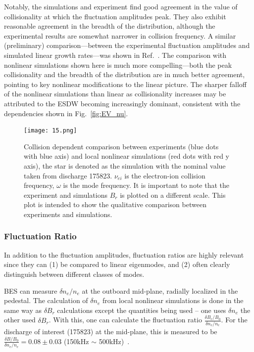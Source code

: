 \documentclass[
 aip,
 amsmath,amssymb,
 reprint
]{revtex4-1}
\begin{document}
Notably, the simulations and experiment find good agreement in the value of collisionality at which the fluctuation amplitudes peak.  They also exhibit reasonable agreement in the breadth of the distribution, although the experimental results are somewhat narrower in collision frequency.  A similar (preliminary) comparison---between the experimental fluctuation amplitudes and simulated linear growth rates---was shown in Ref.~\cite{RIP_Chen_POP_2020}.  The comparison with nonlinear simulations shown here is much more compelling---both the peak collisionality and the breadth of the distribution are in much better agreement, pointing to key nonlinear modifications to the linear picture. The sharper falloff of the nonlinear simulations than linear as collisionality increases may be attributed to the ESDW becoming increasingly dominant, consistent with the dependencies shown in Fig.~\ref{fig:EV_nu}. %

\begin{figure}[ht]
        \texttt{[image: 15.png]}
        \centering
        \caption[font=5]{Collision dependent comparison between experiments (blue dots with blue axis) and local nonlinear simulations (red dots with red y axis), the star is denoted as the simulation with the nominal value taken from discharge 175823. $\nu_{ei}$ is the electron-ion collision frequency, $\omega$ is the mode frequency. It is important to note that the experiment and simulations $B_r$ is plotted on a different scale.  This plot is intended to show the qualitative comparison between experiments and simulations. }
        \label{fig:nu_ei}
\end{figure}



\subsubsection{Fluctuation Ratio}

In addition to the fluctuation amplitudes, fluctuation ratios are highly relevant since they can (1) be compared to linear eigenmodes, and (2) often clearly distinguish between different classes of modes.

BES \cite{bes} can measure $\delta n_e/n_e$ at the outboard mid-plane, radially localized in the pedestal. The calculation of $\delta n_e$ from local nonlinear simulations is done in the same way as $\delta B_r$ calculations except the quantities being used -- one uses $\delta n_e$ the other used $\delta B_r$. With this, one can calculate the fluctuation ratio $\frac{\delta B_r/B_0}{\delta n_e/n_e}$. For the discharge of interest (175823) at the mid-plane, this is measured to be $\frac{\delta B/B_0}{\delta n_e/n_e}= 0.08\pm 0.03$ (150kHz $\sim$ 500kHz)~\cite{RIP_Chen_POP_2020}. 
\end{document}
